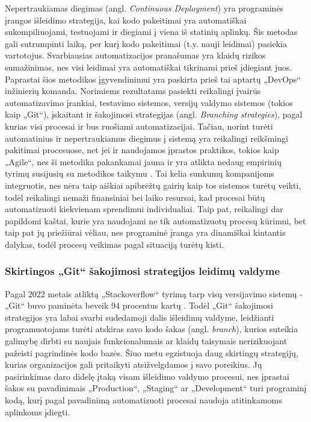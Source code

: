 \documentclass{VUMIFPSkursinis}
\begin{document}
Nepertraukiamas diegimas (angl. \textit{Continuous Deployment}) yra programinės įrangos išleidimo strategija, kai kodo pakeitimai yra automatiškai sukompiliuojami, testuojami ir diegiami į viena iš statinių aplinkų. Šis metodas gali sutrumpinti laiką, per kurį kodo pakeitimai (t.y. nauji leidimai) pasiekia vartotojus. Svarbiausias automatizacijos pranašumas yra klaidų rizikos sumažinimas, nes visi leidimai yra automatiškai tikrinami prieš įdiegiant juos. Paprastai šios metodikos įgyvendinimui yra paskirta prieš tai aptartų „DevOps“ inžinierių komanda. Norimiems rezultatams pasiekti reikalingi įvairūs automatizavimo įrankiai, testavimo sistemos, versijų valdymo sistemos (tokios kaip „Git“), įskaitant ir šakojimosi strategijas (angl. \textit{Branching strategies}), pagal kurias visi procesai ir bus ruošiami automatizacijai. Tačiau, norint turėti automatinius ir nepertraukiamus diegimus į sistemą yra reikalingi reikšmingi pakitimai procesuose, net jei ir naudojamos įprastos praktikos, tokios kaip „Agile“, nes ši metodika pakankamai jauna ir yra atlikta nedaug empirinių tyrimų susijusių su metodikos taikymu \cite{SaltSeptintas}. Tai kelia sunkumų kompanijoms integruotis, nes nėra taip aiškiai apibrėžtų gairių kaip tos sistemos turėtų veikti, todėl reikalingi nemaži finansiniai bei laiko resursai, kad procesai būtų automatizuoti kiekvienam sprendimui individualiai. Taip pat, reikalingi dar papildomi kaštai, kurie yra naudojami ne tik automatizuotų procesų kūrimui, bet taip pat jų priežiūrai vėliau, nes programinė įranga yra dinamiškai kintantis dalykas, todėl procesų veikimas pagal situaciją turėtų kisti.
    
    \subsubsection{Skirtingos „Git“ šakojimosi strategijos leidimų valdyme}

Pagal 2022 metais atliktą „Stackoverflow“ tyrimą tarp visų versijavimo sistemų - „Git“ buvo paminėta beveik 94 procentus kartų \cite{SaltAstuntas}. Todėl „Git“ šakojimosi strategijos yra labai svarbi sudedamoji dalis išleidimų valdyme, leidžianti programuotojams turėti atskiras savo kodo šakas (angl. \textit{branch}), kurios suteikia galimybę dirbti su naujais funkcionalumais ar klaidų taisymais nerizikuojant pažeisti pagrindinės kodo bazės. Šiuo metu egzistuoja daug skirtingų strategijų, kurias organizacijos gali pritaikyti atsižvelgdamos į savo poreikius. Jų pasirinkimas daro didelę įtaką visam išleidimo valdymo procesui, nes įprastai šakos su pavadinimais „Production“, „Staging“ ar „Development“ turi programinį kodą, kurį pagal pavadinimą automatizuoti procesai naudoja atitinkamoms aplinkoms įdiegti.
\end{document}
